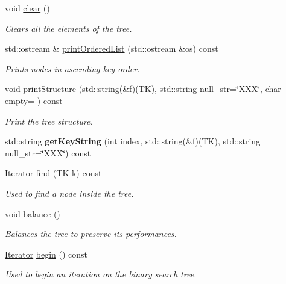 \begin{DoxyCompactItemize}
\mbox{\label{classBST_a005534f138d79356966022b49ef69d77}} 
void \hyperlink{classBST_a005534f138d79356966022b49ef69d77}{clear} ()
\begin{DoxyCompactList}\small\item\em Clears all the elements of the tree. \end{DoxyCompactList}\item 
std\+::ostream \& \hyperlink{classBST_a937aa8f8e587fbb1b7bf655294f15d82}{print\+Ordered\+List} (std\+::ostream \&os) const
\begin{DoxyCompactList}\small\item\em Prints nodes in ascending key order. \end{DoxyCompactList}\item 
\mbox{\label{classBST_a9f9a0ada77dc770850b8231e269b280e}} 
void \hyperlink{classBST_a9f9a0ada77dc770850b8231e269b280e}{print\+Structure} (std\+::string(\&f)(TK), std\+::string null\+\_\+str=\char`\"{}X\+XX\char`\"{}, char empty=\textquotesingle{} \textquotesingle{}) const
\begin{DoxyCompactList}\small\item\em Print the tree structure. \end{DoxyCompactList}\item 
\mbox{\label{classBST_aa4efb0ac8330a43d5a0d688696d49376}} 
std\+::string {\bfseries get\+Key\+String} (int index, std\+::string(\&f)(TK), std\+::string null\+\_\+str=\char`\"{}X\+XX\char`\"{}) const
\item 
\hyperlink{classBST_1_1Iterator}{Iterator} \hyperlink{classBST_af7296223f917c8a457d2081999636e43}{find} (TK k) const
\begin{DoxyCompactList}\small\item\em Used to find a node inside the tree. \end{DoxyCompactList}\item 
void \hyperlink{classBST_a812b874214dac2bc44cbd20144d03533}{balance} ()
\begin{DoxyCompactList}\small\item\em Balances the tree to preserve its performances. \end{DoxyCompactList}\item 
\hyperlink{classBST_1_1Iterator}{Iterator} \hyperlink{classBST_a627f8f8fa85960bd6a52175b42d66d56}{begin} () const
\begin{DoxyCompactList}\small\item\em Used to begin an iteration on the binary search tree. \end{DoxyCompactList}\item 

\end{DoxyCompactItemize}
